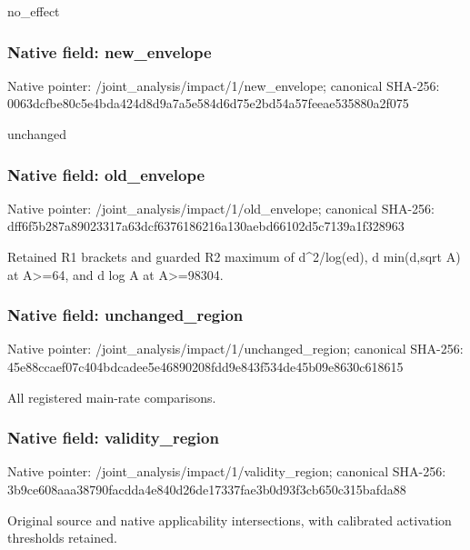 \documentclass[10pt,a4paper]{article}
\begin{document}
\begingroup\raggedright\sloppy no\_\allowbreak{}effect\par\endgroup

\subsubsection{Native field: new\_\allowbreak{}envelope}
Native pointer: /joint\_\allowbreak{}analysis/impact/1/new\_\allowbreak{}envelope; canonical SHA-256: 0063dcfbe80c5e4bda424d8d9a7a5e584d6d75e2bd54a57feeae535880a2f075

\begingroup\raggedright\sloppy unchanged\par\endgroup

\subsubsection{Native field: old\_\allowbreak{}envelope}
Native pointer: /joint\_\allowbreak{}analysis/impact/1/old\_\allowbreak{}envelope; canonical SHA-256: dff6f5b287a89023317a63dcf6376186216a130aebd66102d5c7139a1f328963

\begingroup\raggedright\sloppy Retained R1 brackets and guarded R2 maximum of d\textasciicircum{}2/\allowbreak{}log(ed),\allowbreak{} d min(d,\allowbreak{}sqrt A) at A>=\allowbreak{}64,\allowbreak{} and d log A at A>=\allowbreak{}98304.\par\endgroup

\subsubsection{Native field: unchanged\_\allowbreak{}region}
Native pointer: /joint\_\allowbreak{}analysis/impact/1/unchanged\_\allowbreak{}region; canonical SHA-256: 45e88ccaef07c404bdcadee5e46890208fdd9e843f534de45b09e8630c618615

\begingroup\raggedright\sloppy All registered main-rate comparisons.\par\endgroup

\subsubsection{Native field: validity\_\allowbreak{}region}
Native pointer: /joint\_\allowbreak{}analysis/impact/1/validity\_\allowbreak{}region; canonical SHA-256: 3b9ce608aaa38790facdda4e840d26de17337fae3b0d93f3cb650c315bafda88

\begingroup\raggedright\sloppy Original source and native applicability intersections,\allowbreak{} with calibrated activation thresholds retained.\par\endgroup
\end{document}
